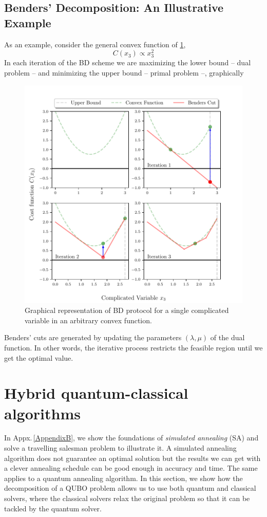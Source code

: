 \subsection{Benders' Decomposition: An Illustrative Example}
As an example, consider the general convex function of \ref{fig:BDIlustration},
\begin{equation}
    C(x_{3}) \propto x_{3}^{2}
\end{equation}
In each iteration of the BD scheme we are maximizing the lower bound -- dual problem -- and minimizing the upper bound -- primal problem --, graphically
\begin{figure}[H]
\centering
\includegraphics[width=\textwidth]{Figures/BenderIlustration.pdf} 
\caption{Graphical representation of BD protocol for a single complicated variable in an arbitrary convex function.}
\label{fig:BDIlustration}
\end{figure}
Benders' cuts are generated by updating the parameters $(\lambda,\mu)$ of the dual function. In other words, the iterative process restricts the feasible region until we get the optimal value.
\section{Hybrid quantum-classical algorithms}
In Appx.\,\ref{AppendixB}, we show the foundations of \textit{simulated annealing} (SA) and solve a travelling salesman problem to illustrate it. A simulated annealing algorithm does not guarantee an optimal solution but the results we can get with a clever annealing schedule can be good enough in accuracy and time. The same applies to a quantum annealing algorithm. In this section, we show how the decomposition of a QUBO problem allows us to use both quantum and classical solvers, where the classical solvers relax the original problem so that it can be tackled by the quantum solver.
